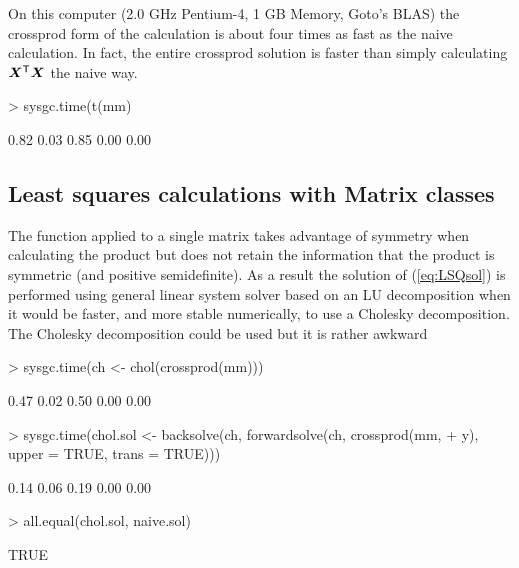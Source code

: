 \documentclass{article}
\begin{document}
On this computer (2.0 GHz Pentium-4, 1 GB Memory, Goto's BLAS) the
crossprod form of the calculation is about four times as fast as the
naive calculation.  In fact, the entire crossprod solution is
faster than simply calculating $\bm{X}^\mathsf{T}\bm{X}$ the naive way.
\begin{Schunk}
\begin{Sinput}
> sysgc.time(t(mm) %*% mm)
\end{Sinput}
\begin{Soutput}
[1] 0.82 0.03 0.85 0.00 0.00
\end{Soutput}
\end{Schunk}

\subsection{Least squares calculations with Matrix classes}
\label{sec:MatrixLSQ}

The  function applied to a single matrix takes
advantage of symmetry when calculating the product but does not retain
the information that the product is symmetric (and positive
semidefinite).  As a result the solution of (\ref{eq:LSQsol}) is
performed using general linear system solver based on an LU
decomposition when it would be faster, and more stable numerically, to
use a Cholesky decomposition.  The Cholesky decomposition could be used
but it is rather awkward
\begin{Schunk}
\begin{Sinput}
> sysgc.time(ch <- chol(crossprod(mm)))
\end{Sinput}
\begin{Soutput}
[1] 0.47 0.02 0.50 0.00 0.00
\end{Soutput}
\begin{Sinput}
> sysgc.time(chol.sol <- backsolve(ch, forwardsolve(ch, crossprod(mm, 
+     y), upper = TRUE, trans = TRUE)))
\end{Sinput}
\begin{Soutput}
[1] 0.14 0.06 0.19 0.00 0.00
\end{Soutput}
\begin{Sinput}
> all.equal(chol.sol, naive.sol)
\end{Sinput}
\begin{Soutput}
[1] TRUE
\end{Soutput}
\end{Schunk}
\end{document}
